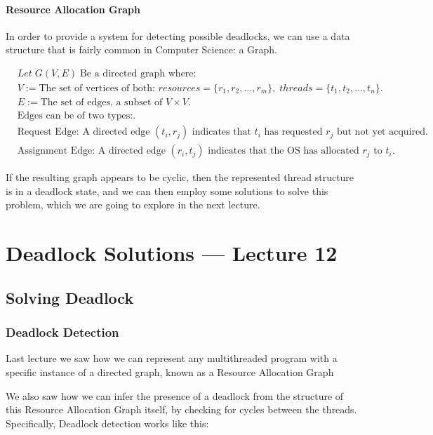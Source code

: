 \documentclass[openright, twoside]{report}
\theoremstyle{definition}
\theoremstyle{example}
\newcommand{\sequence}[2]{
		\{ #1_1, #1_2, \dots, #1_#2 \}
}
\begin{document}
			\subsubsection{ Resource Allocation Graph}
			In order to provide a system for detecting possible deadlocks, 
			we can use a data structure that is fairly common in Computer Science: a Graph.

			\begin{align*}
				&Let \; G(V, E) \; \text{Be a directed graph where:}\\
				&V := \text{The set of vertices of both: } resources = \sequence{r}{m}, \; threads = \sequence{t}{n}.\\
				&E := \text{The set of edges, a subset of } V \times V.\\
				&\text{Edges can be of two types:}.\\
				&\text{Request Edge: A directed edge } (t_i, r_j) \text{ indicates that } t_i \text{ has requested } r_j \text{ but not yet acquired}.\\
				&\text{Assignment Edge: A directed edge } (r_i, t_j) \text{ indicates that the OS has allocated } r_j \text{ to } t_i.
			\end{align*}

			If the resulting graph appears to be cyclic, then the represented thread structure is in a deadlock state, and we can then employ some solutions to 
			solve this problem, which we are going to explore in the next lecture.

\chapter{Deadlock Solutions --- Lecture 12}
\section{Solving Deadlock}
\subsection{Deadlock Detection}
Last lecture we saw how we can represent any multithreaded program with a 
specific instance of a directed graph, known as a Resource Allocation Graph

We also saw how we can infer the presence of a deadlock from the structure of this 
Resource Allocation Graph itself, by checking for cycles between the threads.\\

Specifically, Deadlock detection works like this:
\end{document}
